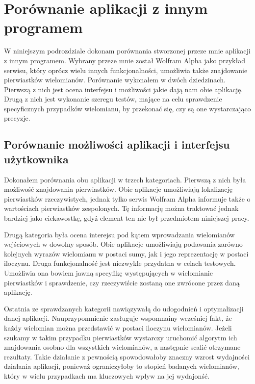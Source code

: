 \section {Porównanie aplikacji z innym programem}

W niniejszym podrozdziale dokonam porównania stworzonej przeze mnie aplikacji z innym programem. Wybrany przeze mnie został Wolfram Alpha jako przykład serwisu, który oprócz wielu innych funkcjonalności, umożliwia także znajdowanie pierwiastków wielomianów. Porównanie wykonałem w dwóch dziedzinach. Pierwszą z nich jest ocena interfejsu i możliwości jakie dają nam obie aplikację. Drugą z nich jest wykonanie szeregu testów, mające na celu sprawdzenie specyficznych przypadków wielomianu, by przekonać się, czy są one wystarczająco precyzje.

\subsection {Porównanie możliwości aplikacji i interfejsu użytkownika}

Dokonałem porównania obu aplikacji w trzech kategoriach. Pierwszą z nich była możliwość znajdowania pierwiastków. Obie aplikacje umożliwiają lokalizację pierwiastków rzeczywistych, jednak tylko serwis Wolfram Alpha informuje także o wartościach pierwiastków zespolonych. Tę informację można traktować jednak bardziej jako ciekawostkę, gdyż element ten nie był przedmiotem niniejszej pracy.

Drugą kategoria była ocena interejsu pod kątem wprowadzania wielomianów wejściowych w dowolny sposób. Obie aplikacje umożliwiają podawania zarówno kolejnych wyrazów wielomianu w postaci sumy, jak i jego reprezentację w postaci iloczynu. Druga funkcjonalność jest niezwykle przydatna w celach testowych. Umożliwia ona bowiem jawną specyfikę występujących w wielomianie pierwiastków i sprawdzenie, czy rzeczywiście zostaną one zwrócone przez daną aplikację.

Ostatnia ze sprawdzanych kategorii nawiązywałą do udogodnień i optymalizacji danej aplikacji. Nauprzypomnienie zasługuje wspomnainy wcześniej fakt, że każdy wielomian można przedstawić w postaci iloczynu wielomianów. Jeżeli szukamy w takim przypadku pierwiastków wystarczy uruchomić algorytm ich znajdowania osobno dla wszystkich wielomianów, a następnie scalić otrzymane rezultaty. Takie działanie z pewnością spowodowałoby znaczny wzrost wydajności działania aplikacji, ponieważ ograniczyłoby to stopień badanych wielomianów, który w wielu przypadkach ma kluczowych wpływ na jej wydajonść.

